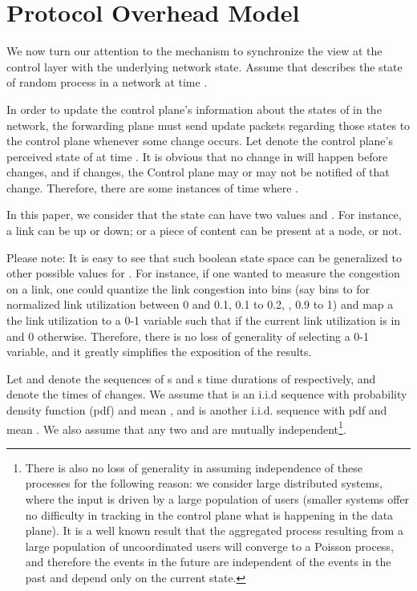 \documentclass[conference]{IEEEtran}
\theoremstyle{plain}
\theoremstyle{remark}
\begin{document}
\section{Protocol Overhead Model}
\label{sec:protocol}

We now turn our attention to the mechanism to synchronize the view at the control layer with the underlying network state. Assume that  describes the state of random process  in a network at time . 

In order to update the control plane's information about the states of  in the network, the forwarding plane must send update packets regarding those states to the control plane whenever some change occurs. Let  denote the control plane's perceived state of  at time . It is obvious that no change in  will happen before  changes, and if  changes, the Control plane may or may not be notified of that change. Therefore,  there are some instances of time where . 

In this paper, we consider that the state can have two values  and . For instance, a link can be up or down; or a piece of content can be present at a node, or not. 

Please note: It is easy to see that such boolean state space can be generalized to other possible values for . For instance, if one wanted to measure the congestion on a link, one could quantize the link congestion into bins (say bins  to  for normalized link utilization between 0 and 0.1, 0.1 to 0.2, , 0.9 to 1) and map a the link utilization to a 0-1 variable such that  if the current link utilization is in  and 0 otherwise. Therefore, there is no loss of generality of selecting a 0-1 variable, and it greatly simplifies the exposition of the results. 

Let  and  denote the sequences of s and s time durations of  respectively, and  denote the times of changes. We assume that  is an i.i.d sequence with probability density function (pdf)  and mean , and  is another i.i.d. sequence with pdf  and mean . We also assume that any two  and  are mutually independent\footnote{There is also no loss of generality in assuming independence of these processes for the following reason: we consider large distributed systems, where the input is driven by a large population of users (smaller systems offer no difficulty in tracking in the control plane what is happening in the data plane). It is a well known result that the aggregated process resulting from a large population of uncoordinated users will converge to a Poisson process, and therefore the events in the future are independent of the events in the past and depend only on the current state.}.
\end{document}
